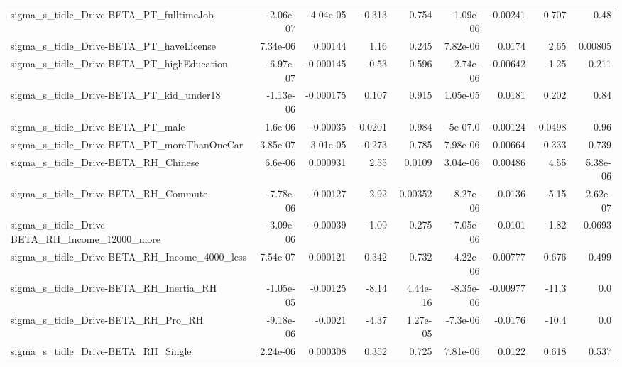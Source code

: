 \begin{tabular}{lrrrrrrrr}
sigma\_s\_tidle\_Drive-BETA\_PT\_fulltimeJob            &   -2.06e-07 &    -4.04e-05 &   -0.313 &    0.754 &  -1.09e-06 &    -0.00241 &       -0.707 &          0.48 \\
sigma\_s\_tidle\_Drive-BETA\_PT\_haveLicense            &    7.34e-06 &      0.00144 &     1.16 &    0.245 &   7.82e-06 &      0.0174 &         2.65 &       0.00805 \\
sigma\_s\_tidle\_Drive-BETA\_PT\_highEducation          &   -6.97e-07 &    -0.000145 &    -0.53 &    0.596 &  -2.74e-06 &    -0.00642 &        -1.25 &         0.211 \\
sigma\_s\_tidle\_Drive-BETA\_PT\_kid\_under18            &   -1.13e-06 &    -0.000175 &    0.107 &    0.915 &   1.05e-05 &      0.0181 &        0.202 &          0.84 \\
sigma\_s\_tidle\_Drive-BETA\_PT\_male                   &    -1.6e-06 &     -0.00035 &  -0.0201 &    0.984 &   -5e-07.0 &    -0.00124 &      -0.0498 &          0.96 \\
sigma\_s\_tidle\_Drive-BETA\_PT\_moreThanOneCar         &    3.85e-07 &     3.01e-05 &   -0.273 &    0.785 &   7.98e-06 &     0.00664 &       -0.333 &         0.739 \\
sigma\_s\_tidle\_Drive-BETA\_RH\_Chinese                &     6.6e-06 &     0.000931 &     2.55 &   0.0109 &   3.04e-06 &     0.00486 &         4.55 &      5.38e-06 \\
sigma\_s\_tidle\_Drive-BETA\_RH\_Commute                &   -7.78e-06 &     -0.00127 &    -2.92 &  0.00352 &  -8.27e-06 &     -0.0136 &        -5.15 &      2.62e-07 \\
sigma\_s\_tidle\_Drive-BETA\_RH\_Income\_12000\_more      &   -3.09e-06 &     -0.00039 &    -1.09 &    0.275 &  -7.05e-06 &     -0.0101 &        -1.82 &        0.0693 \\
sigma\_s\_tidle\_Drive-BETA\_RH\_Income\_4000\_less       &    7.54e-07 &     0.000121 &    0.342 &    0.732 &  -4.22e-06 &    -0.00777 &        0.676 &         0.499 \\
sigma\_s\_tidle\_Drive-BETA\_RH\_Inertia\_RH             &   -1.05e-05 &     -0.00125 &    -8.14 & 4.44e-16 &  -8.35e-06 &    -0.00977 &        -11.3 &           0.0 \\
sigma\_s\_tidle\_Drive-BETA\_RH\_Pro\_RH                 &   -9.18e-06 &      -0.0021 &    -4.37 & 1.27e-05 &   -7.3e-06 &     -0.0176 &        -10.4 &           0.0 \\
sigma\_s\_tidle\_Drive-BETA\_RH\_Single                 &    2.24e-06 &     0.000308 &    0.352 &    0.725 &   7.81e-06 &      0.0122 &        0.618 &         0.537 \\

\end{tabular}
